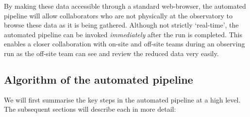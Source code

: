 By making these data accessible through a standard web-browser, the automated pipeline will allow collaborators who are not physically at the observatory to browse these data as it is being gathered. Although not strictly `real-time', the automated pipeline can be invoked \emph{immediately} after the run is completed.  This enables a closer collaboration with on-site and off-site teams during an observing run as the off-site team can see and review the reduced data very easily.  

\subsection{Algorithm of the automated pipeline} 
We will first summarise the key steps in the automated pipeline at a high level. The subsequent sections will describe each in more detail:

